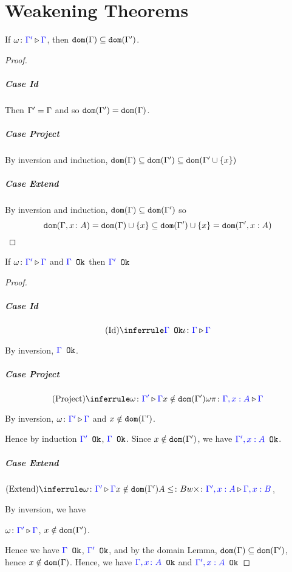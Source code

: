 \documentclass{report}
\begin{document}
\section{Weakening Theorems}

\begin{lemma}
    If $\omega \colon {\color{blue}\Gamma'} \triangleright {\color {blue} \Gamma}$, then $\texttt{dom}(\Gamma)\subseteq \texttt{dom}(\Gamma')$.
\end{lemma}



\begin{framed}
    \begin{proof}
        \subparagraph{Case Id}
        Then $\Gamma' = \Gamma$ and so $\texttt{dom}(\Gamma') = \texttt{dom}(\Gamma)$.
        \subparagraph{Case Project}
        By inversion and induction, $\texttt{dom}(\Gamma)\subseteq\texttt{dom}(\Gamma')\subseteq\texttt{dom}(\Gamma'\cup\left\{x\right\})$
        \subparagraph{Case Extend}
        By inversion and induction, $\texttt{dom}(\Gamma)\subseteq\texttt{dom}(\Gamma')$ so 
        $$\texttt{dom}(\Gamma, x\colon A) = \texttt{dom}(\Gamma)\cup\left\{x\right\} \subseteq\texttt{dom}(\Gamma')\cup\left\{x\right\} = \texttt{dom}(\Gamma',x:A)$$
    \end{proof}
\end{framed}


\begin{theorem}[Ok Preservation]\label{WeakeningPropertyOne}
    If $\omega \colon {\color{blue}\Gamma'} \triangleright {\color {blue} \Gamma}$ and ${\color{blue} \Gamma} \texttt{ Ok}$ then ${\color{blue} \Gamma'} \texttt{ Ok}$  
\end{theorem}



\begin{framed}
    \begin{proof}
        
        \subparagraph{Case Id}
        $$\ntreeruleI{Id}{\ok{\G}}{\wrel{\i}{\G}{\G}}$$
        
        By inversion, ${\color{blue} \Gamma} \texttt{ Ok}$.
        
        \subparagraph{Case Project}
        $$\ntreeruleII{Project}{\wrel{\w}{\G'}{\G}}{ x \notin \dom{\G'}}{\wrel{\w \pi}{\G, x: A}{\G}}$$
        
        By inversion, $\omega \colon {\color{blue}\Gamma'} \triangleright {\color {blue} \Gamma}$ and $x\notin \texttt{dom}(\Gamma')$.
        
        Hence by induction ${\color{blue} \Gamma'} \texttt{ Ok}$, ${\color{blue} \Gamma} \texttt{ Ok}$. Since $x\notin\texttt{dom}(\Gamma')$, we have ${\color{blue} \Gamma', x:A} \texttt{ Ok}$.
        
        \subparagraph{Case Extend}
        $\ntreeruleIII{Extend}{\wrel{\w}{\G'}{\G}}{ x \notin \dom{\G'}}{ A \subtype B}{\wrel{w \x}{\G', x: A}{\G, x: B}}$, 
        
        By inversion, we have 
        
        $\omega \colon {\color{blue}\Gamma'} \triangleright {\color {blue} \Gamma}$, $x\notin\texttt{dom}(\Gamma')$.
        
        Hence we have ${\color{blue} \Gamma} \texttt{ Ok}$, ${\color{blue} \Gamma'} \texttt{ Ok}$, and by the domain Lemma, $\texttt{dom}(\Gamma)\subseteq\texttt{dom}(\Gamma')$, hence $x\notin\texttt{dom}(\Gamma)$. Hence, we have ${\color{blue} \Gamma, x\colon A} \texttt{ Ok}$ and ${\color{blue} \Gamma',x:A} \texttt{ Ok}$
        
        
    \end{proof}
\end{framed}
\end{document}
